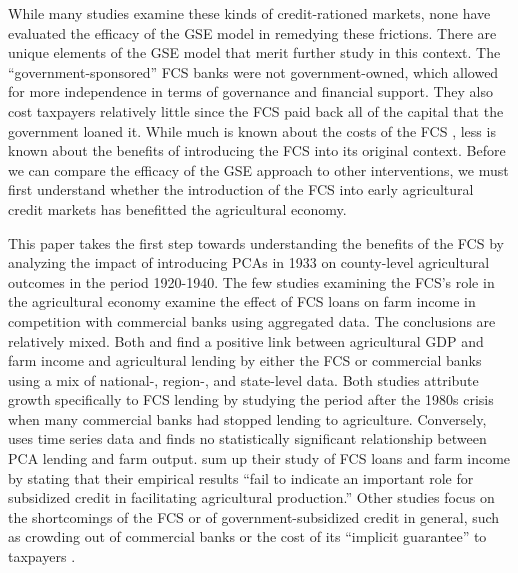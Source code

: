 \documentclass[12pt]{article}
\begin{document}
While many studies examine these kinds of credit-rationed markets, none have evaluated the efficacy of the GSE model in remedying these frictions.
There are unique elements of the GSE model that merit further study in this context.
The ``government-sponsored'' FCS banks were not government-owned, which allowed for more independence in terms of governance and financial support.
They also cost taxpayers relatively little since the FCS paid back all of the capital that the government loaned it. 
While much is known about the costs of the FCS \citep{ohara_tax-exempt_1983,lins_agency_1984}, less is known about the benefits of introducing the FCS into its original context. 
Before we can compare the efficacy of the GSE approach to other interventions, we must first understand whether the introduction of the FCS into early agricultural credit markets has benefitted the agricultural economy.

This paper takes the first step towards understanding the benefits of the FCS by analyzing the impact of introducing PCAs in 1933 on county-level agricultural outcomes in the period 1920-1940.
The few studies examining the FCS's role in the agricultural economy examine the effect of FCS loans on farm income in competition with commercial banks using aggregated data.
The conclusions are relatively mixed.
Both \citet{hartarska_agricultural_2015} and \citet{denis_farm_2017} find a positive link between agricultural GDP and farm income and agricultural lending by either the FCS or commercial banks using a mix of national-, region-, and state-level data.
Both studies attribute growth specifically to FCS lending by studying the period after the 1980s crisis when many commercial banks had stopped lending to agriculture.
Conversely, \citet{belongia1990effects} uses time series data and finds no statistically significant relationship between PCA lending and farm output.
\citet{belongia1990effects} sum up their study of FCS loans and farm income by stating that their empirical results ``fail to indicate an important role for subsidized credit in facilitating agricultural production.''
Other studies focus on the shortcomings of the FCS or of government-subsidized credit in general, such as crowding out of commercial banks \citep{ohara_tax-exempt_1983,gale_economic_1991,alston_why_1994} or the cost of its ``implicit guarantee'' to taxpayers \citep{lins_agency_1984,turvey2012effects}.
\end{document}
